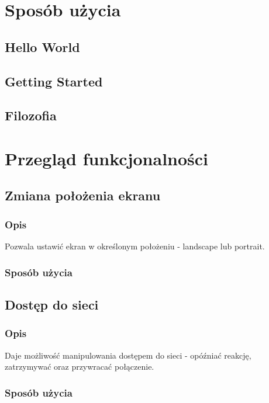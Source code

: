 \documentclass[a4paper]{article}
\begin{document}
\section{Sposób użycia}
\subsection{Hello World}

\subsection{Getting Started}

\subsection{Filozofia}

\section{Przegląd funkcjonalności}
\subsection{Zmiana położenia ekranu}

\subsubsection{Opis}
Pozwala ustawić ekran w określonym położeniu - landscape lub portrait.

\subsubsection{Sposób użycia}

\subsection{Dostęp do sieci}

\subsubsection{Opis}
Daje możliwość manipulowania dostępem do sieci - opóźniać reakcję, zatrzymywać oraz przywracać połączenie.

\subsubsection{Sposób użycia}
\end{document}
